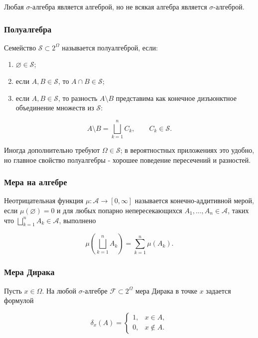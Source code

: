 \documentclass[
  11pt,
  a4paper,
]{article}
\providecommand{\tightlist}{%
  \setlength{\itemsep}{0pt}\setlength{\parskip}{0pt}}
\begin{document}
Любая \(\sigma\)-алгебра является алгеброй, но не всякая алгебра
является \(\sigma\)-алгеброй.

\subsubsection{Полуалгебра}\label{ux43fux43eux43bux443ux430ux43bux433ux435ux431ux440ux430}

Семейство \(\mathcal S\subset 2^\Omega\) называется полуалгеброй, если:

\begin{enumerate}
\def\labelenumi{\arabic{enumi}.}
\tightlist
\item
  \(\varnothing\in\mathcal S\);
\item
  если \(A,B\in\mathcal S\), то \(A\cap B\in\mathcal S\);
\item
  если \(A,B\in\mathcal S\), то разность \(A\setminus B\) представима
  как конечное дизъюнктное объединение множеств из \(\mathcal S\):
\end{enumerate}

\[
A\setminus B=\bigsqcup_{k=1}^n C_k,\qquad C_k\in\mathcal S.
\]

Иногда дополнительно требуют \(\Omega\in\mathcal S\); в вероятностных
приложениях это удобно, но главное свойство полуалгебры - хорошее
поведение пересечений и разностей.

\subsubsection{Мера на
алгебре}\label{ux43cux435ux440ux430-ux43dux430-ux430ux43bux433ux435ux431ux440ux435}

Неотрицательная функция \(\mu:\mathcal A\to[0,\infty]\) называется
конечно-аддитивной мерой, если \(\mu(\varnothing)=0\) и для любых
попарно непересекающихся \(A_1,\ldots,A_n\in\mathcal A\), таких что
\(\bigsqcup_{k=1}^nA_k\in\mathcal A\), выполнено

\[
\mu\left(\bigsqcup_{k=1}^nA_k\right)=\sum_{k=1}^n\mu(A_k).
\]

\subsubsection{Мера
Дирака}\label{ux43cux435ux440ux430-ux434ux438ux440ux430ux43aux430-1}

Пусть \(x\in\Omega\). На любой \(\sigma\)-алгебре
\(\mathcal F\subset 2^\Omega\) мера Дирака в точке \(x\) задается
формулой

\[
\delta_x(A)=
\begin{cases}
1, & x\in A,\\
0, & x\notin A.
\end{cases}
\]
\end{document}

